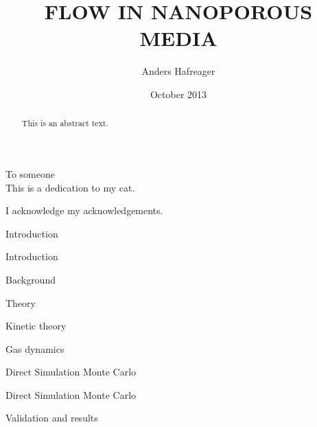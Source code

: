 \documentclass[twoside,english, a4paper, 12pt]{uiofysmaster}
\author{Anders Hafreager}
\title{\uppercase{Flow in nanoporous media}}
\date{October 2013}
\begin{document}
\maketitle
\clearpage

\begin{abstract}
This is an abstract text.
\end{abstract}
\begin{dedication}
  To someone
  \\\vspace{12pt}
  This is a dedication to my cat.
\end{dedication}
\begin{acknowledgements}
  I acknowledge my acknowledgements.
\end{acknowledgements}

\tableofcontents
\clearpage
\listoffigures
\clearpage
\listoftables

\begin{part}{Introduction}
\begin{chapter}{Introduction}
  
\end{chapter}

\begin{chapter}{Background}
  
  
%  
\end{chapter}
\end{part}

\begin{part}{Theory}
\begin{chapter}{Kinetic theory}
  
  
\end{chapter}
\begin{chapter}{Gas dynamics}
  
\end{chapter}
\end{part}

\begin{part}{Direct Simulation Monte Carlo}
\begin{chapter}{Direct Simulation Monte Carlo}
  \label{chap:dsmc}
  
  
  
  
  
  
  
  
  
  
\end{chapter}
\begin{chapter}{Validation and results}
  
  
\end{chapter}
\end{part}
\end{document}
